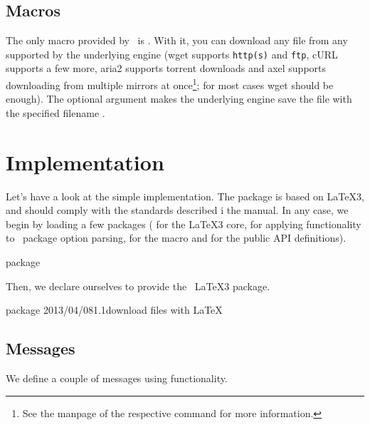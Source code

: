 \documentclass{skdoc}
\begin{document}
    \subsection{Macros}
    \DescribeMacro{}
    The only macro provided by \thepkg\ is . With it, you
    can download any file from any  supported by the underlying
    engine (wget supports \texttt{http(s)} and \texttt{ftp}, cURL
    supports a few more, aria2 supports torrent downloads and axel
    supports downloading from multiple mirrors at once\footnote{See the
    manpage of the respective command for more information.}; for most
    cases  wget should be enough). The
    optional argument  makes the underlying engine save
    the file with the specified filename .

    \Implementation
    \SelfPreambleTo{\mypreamble}
    \section{Implementation}
    Let's have a look at the simple implementation. The package is based
    on \LaTeX3, and should comply with the standards described i the
     manual. In any case, we begin by loading a few packages
    ( for the \LaTeX3 core,  for applying
     functionality to \LaTeXe\ package option parsing,
     for the  macro and 
    for the public API definitions).
\begin{MacroCode}{package}
\RequirePackage{expl3,l3keys2e,pdftexcmds,xparse}
\end{MacroCode}

    Then, we declare ourselves to provide the \thepkg\ \LaTeX3 package.
\begin{MacroCode}{package}
    {2013/04/08}{1.1}{download files with LaTeX}
\end{MacroCode}

    \subsection{Messages}
    We define a couple of messages using  functionality.
\end{document}
